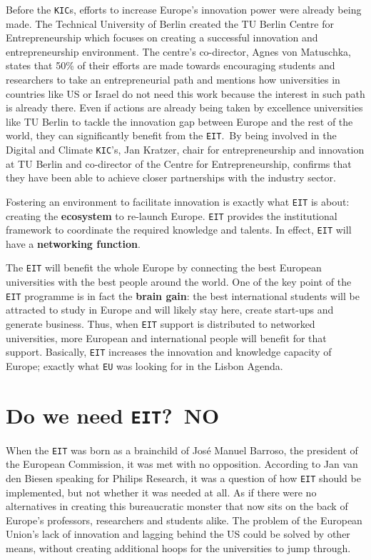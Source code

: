 \documentclass[11pt,a4paper,oneside,twocolumn]{IEEEtran}
\begin{document}
Before the \texttt{KIC}s, efforts to increase Europe's innovation power were already being made. The Technical University of Berlin created the TU Berlin Centre for Entrepreneurship which focuses on creating a successful innovation and entrepreneurship environment.
The centre's co-director, Agnes von Matuschka, states that 50\% of their efforts are made towards encouraging students and researchers to take an entrepreneurial path and mentions how universities in countries like US or Israel do not need this work because the interest in such path is already there.
Even if actions are already being taken by excellence universities like TU Berlin to tackle the innovation gap between Europe and the rest of the world, they can significantly benefit from the \texttt{EIT}.\
By being involved in the Digital and Climate \texttt{KIC}'s, Jan Kratzer, chair for entrepreneurship and innovation at TU Berlin and co-director of the Centre for Entrepreneurship, confirms that they have been able to achieve closer partnerships with the industry sector\cite{4_4}.

Fostering an environment to facilitate innovation is exactly what \texttt{EIT} is about: creating the \textbf{ecosystem} to re-launch Europe. \texttt{EIT} provides the institutional framework to coordinate the required knowledge and talents. In effect, \texttt{EIT} will have a \textbf{networking function}.

The \texttt{EIT} will benefit the whole Europe by connecting the best European universities with the best people around the world. One of the key point of the \texttt{EIT} programme is in fact the \textbf{brain gain}: the best international students will be attracted to study in Europe and will likely stay here, create start-ups and generate business. Thus, when \texttt{EIT} support is distributed to networked universities, more European and international people will benefit for that support. Basically, \texttt{EIT} increases the innovation and knowledge capacity of Europe; exactly what \texttt{EU} was looking for in the Lisbon Agenda.


\section{Do we need \texttt{EIT}?\ NO}
When the \texttt{EIT} was born as a brainchild of Jos\'e Manuel Barroso, the president of the European Commission, it was met with no opposition. According to Jan van den Biesen speaking for Philips Research, it was a question of how \texttt{EIT} should be implemented, but not whether it was needed at all\cite{5_5}. As if there were no alternatives in creating this bureaucratic monster that now sits on the back of Europe's professors, researchers and students alike. The problem of the European Union's lack of innovation and lagging behind the US could be solved by other means, without creating additional hoops for the universities to jump through.
\end{document}
